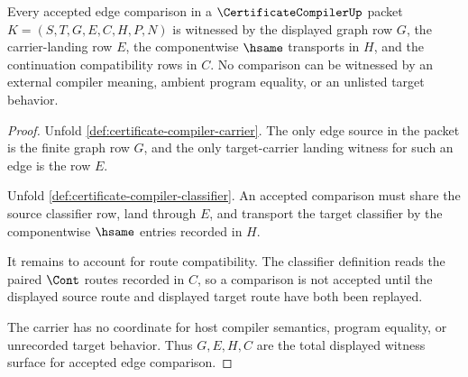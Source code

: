 \begin{theorem}
\label{thm:certificate-compiler-displayed-edge-witness-totality}
Every accepted edge comparison in a $\CertificateCompilerUp$ packet $K=(S,T,G,E,C,H,P,N)$ is witnessed by the displayed graph row $G$, the carrier-landing row $E$, the componentwise $\hsame$ transports in $H$, and the continuation compatibility rows in $C$. No comparison can be witnessed by an external compiler meaning, ambient program equality, or an unlisted target behavior.
\end{theorem}
\begin{proof}
Unfold \autoref{def:certificate-compiler-carrier}. The only edge source in the packet is the finite graph row $G$, and the only target-carrier landing witness for such an edge is the row $E$.

Unfold \autoref{def:certificate-compiler-classifier}. An accepted comparison must share the source classifier row, land through $E$, and transport the target classifier by the componentwise $\hsame$ entries recorded in $H$.

It remains to account for route compatibility. The classifier definition reads the paired $\Cont$ routes recorded in $C$, so a comparison is not accepted until the displayed source route and displayed target route have both been replayed.

The carrier has no coordinate for host compiler semantics, program equality, or unrecorded target behavior. Thus $G,E,H,C$ are the total displayed witness surface for accepted edge comparison.
\end{proof}


